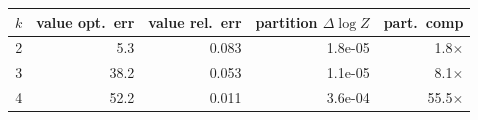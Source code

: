 \begin{tabular}{rrrrr}
\toprule
$k$ & value opt.\ err & value rel.\ err & partition $\Delta\log Z$ & part.\ comp \\
\midrule
2 & 5.3 & 0.083 & 1.8e-05 & 1.8$\times$ \\
3 & 38.2 & 0.053 & 1.1e-05 & 8.1$\times$ \\
4 & 52.2 & 0.011 & 3.6e-04 & 55.5$\times$ \\
\bottomrule
\end{tabular}
